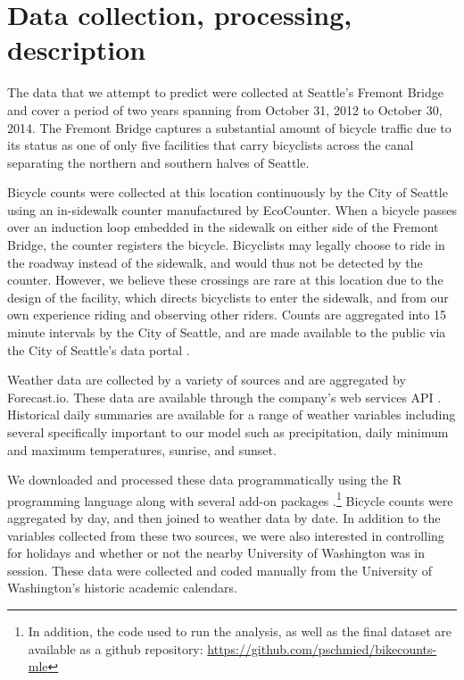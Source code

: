 \documentclass[12pt,letterpaper,article]{memoir}
\begin{document}
\FloatBarrier
\section*{Data collection, processing, description}
%
% 

The data that we attempt to predict were collected at Seattle's
Fremont Bridge and cover a period of two years spanning from October
31, 2012 to October 30, 2014. The Fremont Bridge captures a
substantial amount of bicycle traffic due to its status as one of only
five facilities that carry bicyclists across the canal separating the
northern and southern halves of Seattle.

Bicycle counts were collected at this location continuously by the
City of Seattle using an in-sidewalk counter manufactured by
EcoCounter. When a bicycle passes over an induction loop embedded in
the sidewalk on either side of the Fremont Bridge, the counter
registers the bicycle. Bicyclists may legally choose to ride in the
roadway instead of the sidewalk, and would thus not be detected by the
counter. However, we believe these crossings are rare at this location
due to the design of the facility, which directs bicyclists to enter
the sidewalk, and from our own experience riding and observing other
riders. Counts are aggregated into 15 minute intervals by the City of
Seattle, and are made available to the public via the City of
Seattle's data
portal \parencite{City-of-Seattle:aa,City-of-Seattle:ab}.

Weather data are collected by a variety of sources and are aggregated
by Forecast.io. These data are available through the company's web
services API \parencite{The-Dark-Sky-Company:aa}. Historical daily
summaries are available for a range of weather variables including
several specifically important to our model such as precipitation,
daily minimum and maximum temperatures, sunrise, and sunset.

We downloaded and processed these data programmatically using the R
programming language along with several add-on
packages \parencite{Grolemund:2011aa,Wickham:2011aa,Couture-Beil:2014aa,Lang:2014aa,R-Core-Team:2014aa}.\footnote{In
addition, the code used to run the analysis, as well as the final
dataset are available as a github repository: \url{https://github.com/pschmied/bikecounts-mle}}
Bicycle counts were aggregated by day, and then joined to weather data
by date. In addition to the variables collected from these two
sources, we were also interested in controlling for holidays and
whether or not the nearby University of Washington was in session.
These data were collected and coded manually from the University of
Washington's historic academic calendars.
\end{document}
